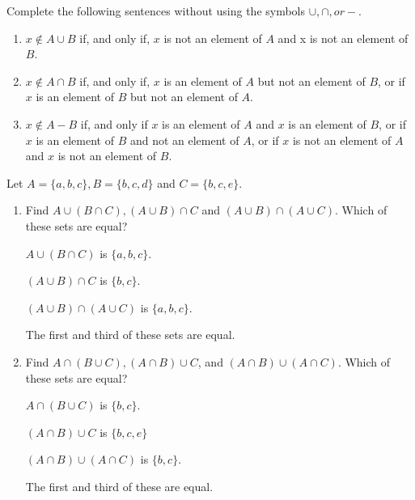 \documentclass[12pt]{article}
\newenvironment{modenumerate}
  {\enumerate\setupmodenumerate}
  {\endenumerate}
\newif\ifmoditem
\newcommand{\setupmodenumerate}{%
  \global\moditemfalse
  \let\origmakelabel\makelabel
  \def\moditem##1{\global\moditemtrue\def\mesymbol{##1}\item}%
  \def\makelabel##1{%
    \origmakelabel{##1\ifmoditem\rlap{\mesymbol}\fi\enspace}%
    \global\moditemfalse}%
}
\begin{document}
\begin{modenumerate}
  \setcounter{enumi}{8}
\item %
Complete the following sentences without using the symbols $\cup, \cap, or -$.
\begin{enumerate}
\item $x \not\in A \cup B$ if, and only if, $x$ is not an element of $A$ and x is not an element of $B$.
\item $x \not\in A \cap B$ if, and only if, $x$ is an element of $A$ but not an element of $B$, or if $x$ is
  an element of $B$ but not an element of $A$.
\item $x \not\in A - B$ if, and only if $x$ is an element of $A$ and $x$ is an element of $B$, or if $x$ is an
  element of $B$ and not an element of $A$, or if $x$ is not an element of $A$ and $x$ is not an element of
  $B$.
\end{enumerate}
  \setcounter{enumi}{15}
\moditem{*} %
Let $A = \{a,b,c\}, B = \{b,c,d\}$ and $C = \{b,c,e\}$.
\begin{enumerate}
\item Find $A \cup (B \cap C), (A \cup B) \cap C$ and $(A \cup B) \cap (A \cup C)$. Which of these sets are
  equal?

$A \cup (B \cap C)$ is $\{a,b,c\}$.

$(A \cup B) \cap C$ is $\{b,c\}$.

$(A \cup B) \cap (A \cup C)$ is $\{a,b,c\}$.

The first and third of these sets are equal.
\item Find $A \cap (B \cup C), (A \cap B) \cup C$, and $(A \cap B) \cup (A \cap C)$. Which of these sets are
  equal?

$A \cap (B \cup C)$ is $\{b,c\}$.

$(A \cap B) \cup C$ is $\{b,c,e\}$

$(A \cap B) \cup (A \cap C)$ is $\{b,c\}$.

The first and third of these are equal.

\end{enumerate}

\end{modenumerate}
\end{document}
